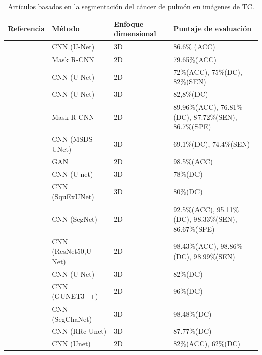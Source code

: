 \documentclass[11pt,a4paper,openany]{article}
\begin{document}
        \begin{table}[H]
            \caption{Artículos basados en la segmentación del cáncer de pulmón en imágenes de TC.\label{tab:SegRef}}
            \begin{center}
            \begin{tabular}{p{2.8cm} p{4cm} p{3.2cm} p{3.5cm}}
            \hline
            \textbf{Referencia} & \textbf{Método} & \textbf{Enfoque dimensional} & \textbf{Puntaje de evaluación} \\ \hline
            \cite{Alakwaa2017} & CNN (U-Net) & 3D & 86.6\% (ACC) \\
            \hline
            \cite{Liu2018} & Mask R-CNN & 2D & 79.65\%(ACC) \\
            \hline
            \cite{Jiang2019} & CNN (U-Net) & 2D & 72\%(ACC), 75\%(DC), 82\%(SEN) \\
            \hline
            \cite{Baek2019} & CNN (U-Net) & 3D & 82,8\%(DC) \\
            \hline
            \cite{Hu2020} & Mask R-CNN & 2D & 89.96\%(ACC), 76.81\%(DC), 87.72\%(SEN), 86.7\%(SPE) \\
            \hline
            \cite{Yang2021} & CNN (MSDS-UNet) & 3D & 69.1\%(DC), 74.4\%(SEN) \\
            \hline
            \cite{Tan2021} & GAN & 2D & 98.5\%(ACC) \\
            \hline
            \cite{Gainey2021} & CNN (U-net) & 3D & 78\%(DC) \\
            \hline
            \cite{Dutande2021} & CNN (SquExUNet) & 3D & 80\%(DC) \\
            \hline
            \cite{Chen2021-2} & CNN (SegNet) & 2D & 92.5\%(ACC), 95.11\%(DC), 98.33\%(SEN), 86.67\%(SPE) \\
            \hline
            \cite{Salama2021} & CNN (ResNet50,U-Net) & 2D & 98.43\%(ACC), 98.86\%(DC), 98.99\%(SEN) \\
            \hline
            \cite{Primakov2022} & CNN (U-Net) & 3D & 82\%(DC) \\
            \hline
            \cite{Aversano2022}& CNN (GUNET3++) & 2D & 96\%(DC) \\
            \hline
            \cite{Cifci2022} & CNN (SegChaNet) & 3D & 98.48\%(DC) \\
            \hline
            \cite{Le2023} & CNN (RRc-Unet) & 3D & 87.77\%(DC) \\
            \hline
            \cite{V2023} & CNN (Unet) & 2D & 82\%(ACC), 62\%(DC) \\

\end{tabular}
\end{center}
\end{table}
\end{document}
